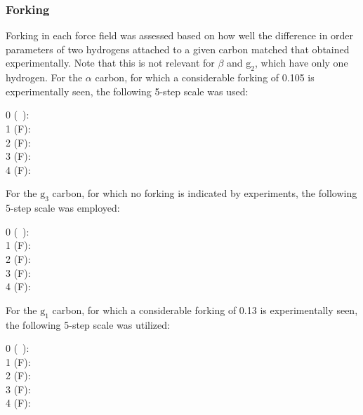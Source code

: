 \documentclass[journal=jpcbfk,manuscript=article]{achemso}
\begin{document}
\subsubsection*{Forking}
Forking in each force field was assessed based on how well the difference in order parameters of two hydrogens attached to a given carbon matched that obtained experimentally. Note that this is not relevant for $\beta$ and $\mathrm{g_2}$, which have only one hydrogen. For the $\alpha$ carbon,  for which a considerable forking of 0.105 is experimentally seen, the following 5-step scale was used:
\begin{description}
\item [0 (~):] 
%
\item [1 ({\textsf{\tiny F}}):] 
%
\item [2  ({\textsf{\small F}}):] 
%
\item [3 ({\textsf{\large F}}):] 
%
\item [4 ({\textsf{\Large F}}):] 
\end{description}
%
For the $\mathrm{g_3}$ carbon, for which no forking is indicated by experiments, the following 5-step scale was employed:
%
\begin{description}
\item [0 (~):] 
%
\item [1 ({\textsf{\tiny F}}):] 
%
\item [2  ({\textsf{\small F}}):] 
%
\item [3 ({\textsf{\large F}}):] 
%
\item [4 ({\textsf{\Large F}}):] 
\end{description}
%
For the $\mathrm{g_1}$ carbon, for which a considerable forking of 0.13 is experimentally seen, the following 5-step scale was utilized:
%
\begin{description}
\item [0 (~):] 
%
\item [1 ({\textsf{\tiny F}}):] 
%
\item [2  ({\textsf{\small F}}):] 
%
\item [3 ({\textsf{\large F}}):] 
%
\item [4 ({\textsf{\Large F}}):] 
\end{description}
\end{document}
